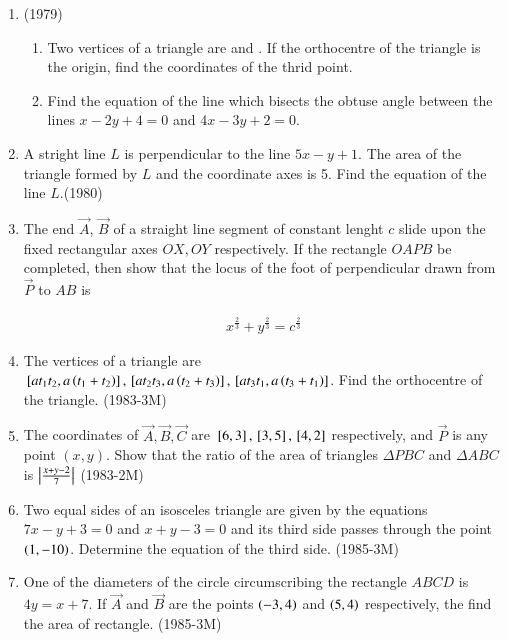 \documentclass[journal,12pt,twocolumn]{IEEEtran}
\theoremstyle{remark}
\begin{document}
 \begin{enumerate}[start=4]


\item                    	\hfill{(1979)}
	\begin{enumerate}
             \item  Two vertices of a triangle are  and . If the orthocentre of the triangle is the origin, find the coordinates of the thrid point.
	     \item  Find the equation of the line which bisects the obtuse angle between  the lines $x-2y+4=0$ and $4x-3y+2=0$.
         \end{enumerate}

\item A stright line $L$ is perpendicular to the line $5x-y+1$. The area of the triangle formed by $L$ and the coordinate axes is 5. Find the equation of the line $L$.\hfill{(1980)}

\item The end $\vec{A}$, $\vec{B}$ of a straight line segment of constant lenght $c$ slide upon the fixed rectangular axes $ OX, OY$ respectively. If the rectangle $OAPB$ be completed, then show that the locus of the foot of perpendicular drawn from $\vec{P}$ to $AB$ is 

 \begin{align*}  x^\frac{2}{3} + y^\frac{2}{3} = c^\frac{2}{3} \end{align*}

  \item The vertices of a triangle are ${}\left[ at_1t_2,a\left(t_1+t_2\right)\right], {}\left[ at_2t_3,a\left(t_2+t_3\right)\right],{}\left[at_3t_1,a\left(t_3+t_1\right)\right]$. Find the orthocentre of the triangle. \hfill{(1983-3M)}
	  
  \item The coordinates of $\vec{A},\vec{B},\vec{C}$ are $ {}\left[6,3\right], {}\left[3,5\right], {}\left[4,2\right] $ respectively, and $\vec{P}$ is any point $(x,y)$.
Show that the ratio of the area of triangles $\Delta PBC$  and $\Delta ABC$ is $\left\vert\frac{x+y-2}{7}\right\vert$ \hfill{(1983-2M)} 

\item Two equal sides of an isosceles triangle are given by the equations $7x-y+3=0$ and $x+y-3=0$ and its third side passes through the point $\left(1,-10\right)$. Determine the equation of the third side.  \hfill{(1985-3M)}

\item One of the diameters of the circle circumscribing the rectangle $ABCD$ is $4y=x+ 7$. If $\vec{A}$ and $\vec{B}$ are the points $\left(-3,4\right)$ and $\left(5,4\right)$ respectively, the find the area of rectangle.  \hfill{(1985-3M)}



\end{enumerate}
\end{document}
